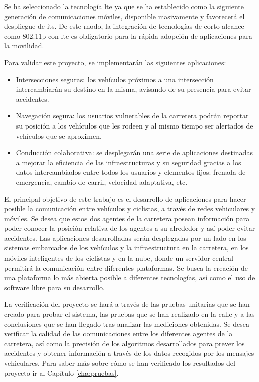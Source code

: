 Se ha seleccionado la tecnología \gls{lte} ya que se ha establecido como la
siguiente generación de comunicaciones móviles, disponible masivamente y
favorecerá el despliegue de \gls{its}. De este modo, la integración de
tecnologías de corto alcance como \Gls{802.11p} con \gls{lte} es obligatorio
para la rápida adopción de aplicaciones para la movilidad.

Para validar este proyecto, se implementarán las siguientes aplicaciones:
\begin{itemize}
	\item Intersecciones seguras: los vehículos próximos a una intersección
	intercambiarán su destino en la misma, avisando de su presencia para evitar
	accidentes.

	\item Navegación segura: los usuarios vulnerables de la carretera podrán
	reportar su posición a los vehículos que les rodeen y al mismo tiempo ser
	alertados de vehículos que se aproximen.

	\item Conducción colaborativa: se desplegarán una serie de aplicaciones
	destinadas a mejorar la eficiencia de las infraestructuras y su seguridad
	gracias a los datos intercambiados entre todos los usuarios y elementos fijos:
	frenada de emergencia, cambio de carril, velocidad adaptativa, etc.
\end{itemize}

El principal objetivo de este trabajo es el desarrollo de aplicaciones para
hacer posible la comunicación entre vehículos y ciclistas, a través de redes
vehiculares y móviles. Se desea que estos dos agentes de la carretera posean
información para poder conocer la posición relativa de los agentes a su
alrededor y así poder evitar accidentes. Las aplicaciones desarrolladas serán
desplegadas por un lado en los sistemas embarcados de los vehículos y la
infraestructura en la carretera, en los móviles inteligentes de los ciclistas y
en la nube, donde un servidor central permitirá la comunicación entre diferentes
plataformas. Se busca la creación de una plataforma lo más abierta posible a
diferentes tecnologías, así como el uso de software libre para su desarrollo.

La verificación del proyecto se hará a través de las pruebas unitarias que se
han creado para probar el sistema, las pruebas que se han realizado en la calle
y a las conclusiones que se han llegado tras analizar las mediciones obtenidas.
Se desea verificar la calidad de las comunicaciones entre los diferentes agentes
de la carretera, así como la precisión de los algoritmos desarrollados para
prever los accidentes y obtener información a través de los datos recogidos por
los mensajes vehiculares. Para saber más sobre cómo se han verificado los
resultados del proyecto ir al Capítulo \ref{cha:pruebas}.

